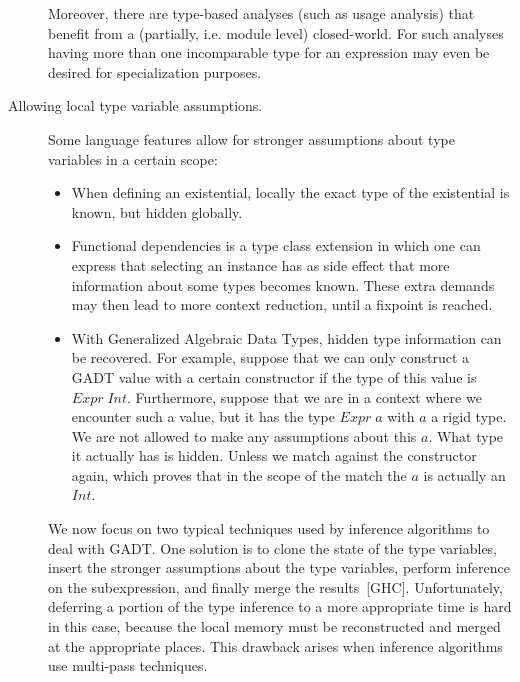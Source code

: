 \documentclass[preprint,natbib]{sigplanconf}
\begin{document}
\begin{description}
    Moreover, there are type-based analyses (such as usage analysis) that
    benefit from a (partially, i.e. module level) closed-world. For such
    analyses having more than one incomparable type for an expression may even
    be desired for specialization purposes.
  \item[Allowing local type variable assumptions.]
    Some language features allow for stronger assumptions about type variables
    in a certain scope:
    \begin{itemize}
    \item When defining an existential, locally the exact type of the existential
      is known, but hidden globally.
    \item Functional dependencies is a type class extension in which one can express
      that selecting an instance has as side effect that more information about
      some types becomes known. These extra demands may then lead to more
      context reduction, until a fixpoint is reached.
    \item With Generalized Algebraic Data Types, hidden type information can be
      recovered. For example, suppose
      that we can only construct a GADT value with a certain constructor if
      the type of this value is $Expr\;Int$. Furthermore, suppose that we are
      in a context where we encounter such a value, but it has the type
      $Expr\;a$ with $a$ a rigid type. We are not allowed to make any
      assumptions about this $a$. What type it actually has is hidden. Unless
      we match against the constructor again, which proves that in the scope of
      the match the $a$ is actually an $Int$.
    \end{itemize}

    We now focus on two typical techniques used by inference algorithms to deal
    with GADT. One solution is to clone the state of the type
    variables, insert the stronger assumptions about the type variables,
    perform inference on the subexpression, and finally merge the results~[GHC].
    Unfortunately, deferring a portion of the type inference to a more
    appropriate time is hard in this case, because the local memory must be
    reconstructed and merged at the appropriate places. This drawback arises
    when inference algorithms use multi-pass techniques.
    

\end{description}
\end{document}
